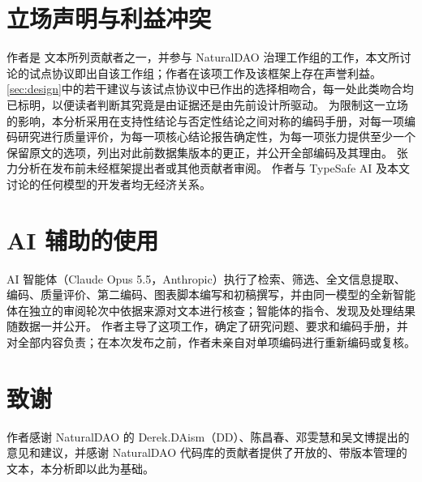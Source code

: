 \section*{立场声明与利益冲突}
\label{sec:statements}
作者是 \pol{} 文本所列贡献者之一，并参与 NaturalDAO 治理工作组的工作，本文所讨论的试点协议即出自该工作组；作者在该项工作及该框架上存在声誉利益。
\cref{sec:design}中的若干建议与该试点协议中已作出的选择相吻合，每一处此类吻合均已标明，以便读者判断其究竟是由证据还是由先前设计所驱动。
为限制这一立场的影响，本分析采用在支持性结论与否定性结论之间对称的编码手册，对每一项编码研究进行质量评价，为每一项核心结论报告确定性，为每一项张力提供至少一个保留原文的选项，列出对此前数据集版本的更正，并公开全部编码及其理由。
张力分析在发布前未经框架提出者或其他贡献者审阅。
作者与 TypeSafe AI 及本文讨论的任何模型的开发者均无经济关系。

\section*{AI 辅助的使用}
AI 智能体（Claude Opus 5.5，Anthropic）执行了检索、筛选、全文信息提取、编码、质量评价、第二编码、图表脚本编写和初稿撰写，并由同一模型的全新智能体在独立的审阅轮次中依据来源对文本进行核查；智能体的指令、发现及处理结果随数据一并公开。
作者主导了这项工作，确定了研究问题、要求和编码手册，并对全部内容负责；在本次发布之前，作者未亲自对单项编码进行重新编码或复核。

\section*{致谢}
作者感谢 NaturalDAO 的 Derek.DAism（DD）、陈昌春、邓雯慧和吴文博提出的意见和建议，并感谢 NaturalDAO 代码库的贡献者提供了开放的、带版本管理的 \pol{} 文本，本分析即以此为基础。

